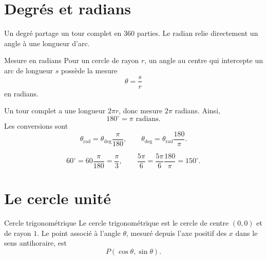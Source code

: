 \documentclass[12pt,a4paper,openany]{book}
\begin{document}
\section{Degrés et radians}

Un degré partage un tour complet en $360$ parties. Le radian relie directement un angle à une longueur d'arc.

\begin{definition}{Mesure en radians}{}
Pour un cercle de rayon $r$, un angle au centre qui intercepte un arc de longueur $s$ possède la mesure
\[
\theta=\frac sr
\]
en radians.
\end{definition}

Un tour complet a une longueur $2\pi r$, donc mesure $2\pi$ radians. Ainsi,
\[
180^\circ=\pi\text{ radians}.
\]
Les conversions sont
\[
\theta_{\mathrm{rad}}=\theta_{\mathrm{deg}}\frac{\pi}{180},
\qquad
\theta_{\mathrm{deg}}=\theta_{\mathrm{rad}}\frac{180}{\pi}.
\]

\begin{examplebox}
\[
60^\circ=60\frac{\pi}{180}=\frac\pi3,
\qquad
\frac{5\pi}{6}=\frac{5\pi}{6}\frac{180}{\pi}=150^\circ.
\]
\end{examplebox}

\section{Le cercle unité}

\begin{definition}{Cercle trigonométrique}{}
Le cercle trigonométrique est le cercle de centre $(0,0)$ et de rayon $1$. Le point associé à l'angle $\theta$, mesuré depuis l'axe positif des $x$ dans le sens antihoraire, est
\[
P(\cos\theta,\sin\theta).
\]
\end{definition}

\begin{center}
\end{center}
\end{document}
